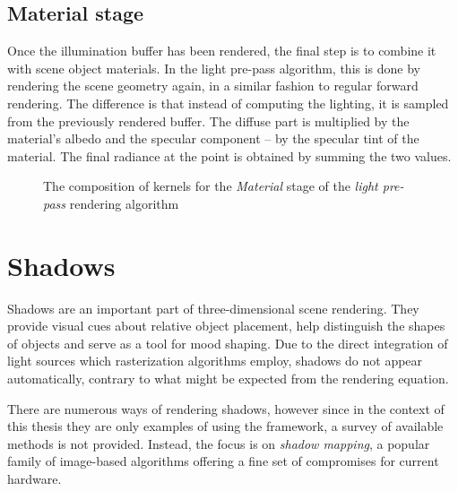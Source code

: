 \subsection{Material stage}

Once the illumination buffer has been rendered, the final step is to combine it with scene object materials. In the light pre-pass algorithm, this is done by rendering the scene geometry again, in a similar fashion to regular forward rendering. The difference is that instead of computing the lighting, it is sampled from the previously rendered buffer. The diffuse part is multiplied by the material's albedo and the specular component -- by the specular tint of the material. The final radiance at the point is obtained by summing the two values.

\begin{figure}[ht!]
  \centering
    \caption[Light Pre-Pass Stage 3]{The composition of kernels for the \emph{Material} stage of the  \emph{light pre-pass} rendering algorithm}
  \label{fig:DeferredLightingStage3}
\end{figure}

\clearpage
\section{Shadows}

Shadows are an important part of three-dimensional scene rendering. They provide visual cues about relative object placement, help distinguish the shapes of objects and serve as a tool for mood shaping. Due to the direct integration of light sources which rasterization algorithms employ, shadows do not appear automatically, contrary to what might be expected from the rendering equation.

There are numerous ways of rendering shadows, however since in the context of this thesis they are only examples of using the framework, a survey of available methods is not provided. Instead, the focus is on \emph{shadow mapping}, a popular family of image-based algorithms offering a fine set of compromises for current hardware.

